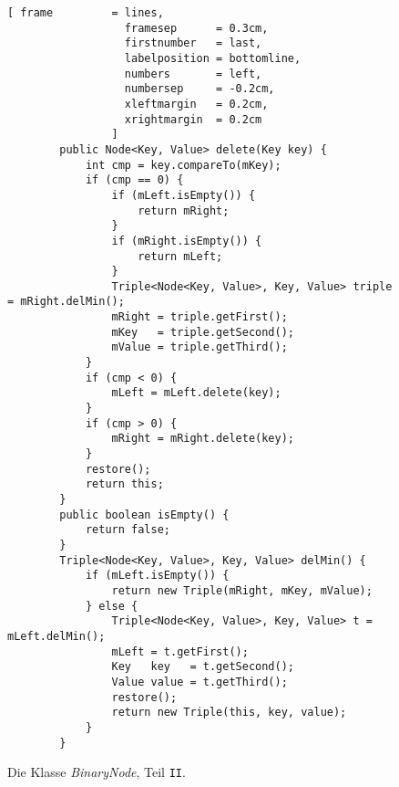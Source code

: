 \begin{figure}[!ht]
  \centering
\begin{Verbatim}[ frame         = lines, 
                  framesep      = 0.3cm, 
                  firstnumber   = last,
                  labelposition = bottomline,
                  numbers       = left,
                  numbersep     = -0.2cm,
                  xleftmargin   = 0.2cm,
                  xrightmargin  = 0.2cm
                ]
        public Node<Key, Value> delete(Key key) {
            int cmp = key.compareTo(mKey);
            if (cmp == 0) {
                if (mLeft.isEmpty()) {
                    return mRight;
                } 
                if (mRight.isEmpty()) {
                    return mLeft;
                }
                Triple<Node<Key, Value>, Key, Value> triple = mRight.delMin();
                mRight = triple.getFirst();
                mKey   = triple.getSecond();
                mValue = triple.getThird();
            }
            if (cmp < 0) {
                mLeft = mLeft.delete(key);
            }
            if (cmp > 0) {
                mRight = mRight.delete(key);
            }
            restore();
            return this;
        }
        public boolean isEmpty() {
            return false;
        }    
        Triple<Node<Key, Value>, Key, Value> delMin() {
            if (mLeft.isEmpty()) {
                return new Triple(mRight, mKey, mValue);
            } else {
                Triple<Node<Key, Value>, Key, Value> t = mLeft.delMin();
                mLeft = t.getFirst();
                Key   key   = t.getSecond();
                Value value = t.getThird();
                restore();
                return new Triple(this, key, value);
            }
        }
\end{Verbatim}
\vspace*{-0.3cm}
  \caption{Die Klasse \textsl{BinaryNode}, Teil \texttt{II}.}
  \label{fig:BinaryNode-AVL-II.java}
\end{figure}

